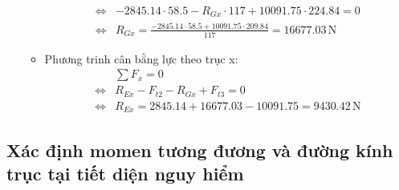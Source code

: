 \begin{itemize}
\begin{itemize}
\begin{align*}
                                    \Leftrightarrow& -2845.14 \cdot 58.5 - R_{Gx} \cdot 117 + 10091.75 \cdot 224.84 = 0 \\
                                    \Leftrightarrow& R_{Gx} = \frac{-2845.14 \cdot 58.5 + 10091.75 \cdot 209.84}{117} = 16677.03\, \mathrm{N}
                                \end{align*}
                            \item Phương trinh cân bằng lực theo trục x:
                                \begin{align*}
                                    &\sum{F_{x}} = 0 \\
                                    \Leftrightarrow& R_{Ex} - F_{t2} - R_{Gx} + F_{t3} = 0 \\
                                    \Leftrightarrow& R_{Ex} = 2845.14 + 16677.03 - 10091.75 = 9430.42\, \mathrm{N}
                                \end{align*}
                        \end{itemize}
                \end{itemize}
                    
        \subsection{Xác định momen tương đương và đường kính trục tại tiết diện nguy hiểm}
